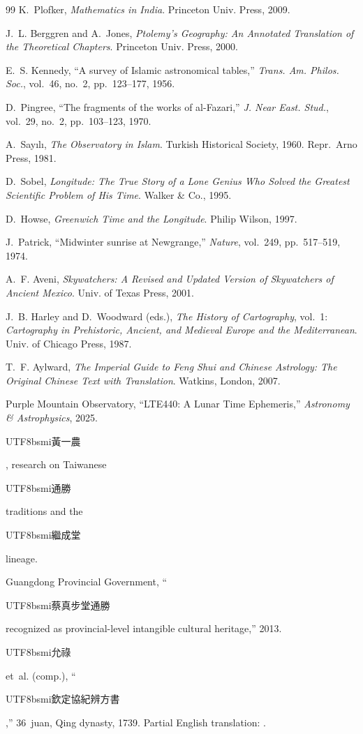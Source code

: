 \documentclass[10pt,a4paper]{article}
\newcommand{\zh}[1]{\begin{CJK}{UTF8}{bsmi}#1\end{CJK}}
\begin{document}
\begin{sloppypar}
\begin{thebibliography}{99}
K.~Plofker,
\textit{Mathematics in India}.
Princeton Univ. Press, 2009.

J.~L. Berggren and A.~Jones,
\textit{Ptolemy's Geography: An Annotated Translation of the Theoretical
Chapters}.
Princeton Univ. Press, 2000.

E.~S. Kennedy,
``A survey of Islamic astronomical tables,''
\textit{Trans. Am. Philos. Soc.}, vol.~46, no.~2, pp.~123--177, 1956.

D.~Pingree,
``The fragments of the works of al-Fazari,''
\textit{J. Near East. Stud.}, vol.~29, no.~2, pp.~103--123, 1970.

A.~Say{\i}l{\i},
\textit{The Observatory in Islam}.
Turkish Historical Society, 1960. Repr.\ Arno Press, 1981.

D.~Sobel,
\textit{Longitude: The True Story of a Lone Genius Who Solved the Greatest
Scientific Problem of His Time}.
Walker \& Co., 1995.

D.~Howse,
\textit{Greenwich Time and the Longitude}.
Philip Wilson, 1997.

J.~Patrick,
``Midwinter sunrise at Newgrange,''
\textit{Nature}, vol.~249, pp.~517--519, 1974.

A.~F. Aveni,
\textit{Skywatchers: A Revised and Updated Version of Skywatchers of Ancient
Mexico}.
Univ. of Texas Press, 2001.

J.~B. Harley and D.~Woodward (eds.),
\textit{The History of Cartography}, vol.~1:
\textit{Cartography in Prehistoric, Ancient, and Medieval Europe and the
Mediterranean}.
Univ. of Chicago Press, 1987.

T.~F. Aylward,
\textit{The Imperial Guide to Feng Shui and Chinese Astrology: The Original
Chinese Text with Translation}.
Watkins, London, 2007.

Purple Mountain Observatory,
``LTE440: A Lunar Time Ephemeris,''
\textit{Astronomy \& Astrophysics}, 2025.

\zh{黃一農}, research on Taiwanese \zh{通勝} traditions and the
\zh{繼成堂} lineage.

Guangdong Provincial Government,
``\zh{蔡真步堂通勝} recognized as provincial-level intangible cultural
heritage,'' 2013.

\zh{允祿} et~al. (comp.),
``\zh{欽定協紀辨方書},'' 36~juan, Qing dynasty, 1739.
Partial English translation: \cite{aylward2007}.


\end{thebibliography}
\end{sloppypar}
\end{document}
